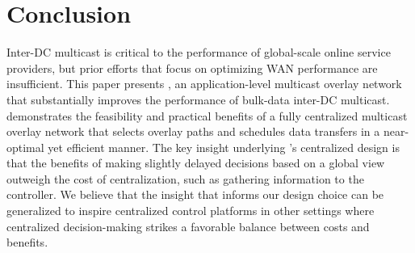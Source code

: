 \section{Conclusion}
Inter-DC multicast is critical to the performance of 
global-scale online service providers, but 
prior efforts that focus 
on optimizing WAN performance are insufficient.
This paper presents \name, 
an application-level multicast overlay network that substantially
improves the performance of 
bulk-data inter-DC multicast.
\name demonstrates the feasibility
and practical benefits of a fully centralized multicast overlay
network that selects overlay paths and schedules data transfers 
in a near-optimal yet efficient manner.
The key insight underlying \name's centralized design is that 
the benefits of making slightly delayed 
decisions based on a global view outweigh the cost of 
centralization, such as gathering information to the 
controller.
We believe that the insight that informs our design choice 
can be generalized to inspire centralized control platforms 
in other settings where centralized decision-making strikes 
a favorable balance between costs and benefits.
